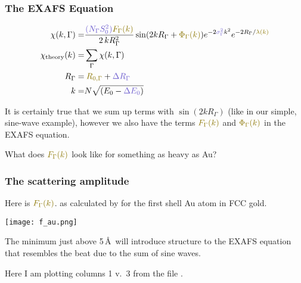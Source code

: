 \documentclass[10pt, xcolor=x11names, compress]{beamer}
\begin{document}
\begin{frame}
  \frametitle{The EXAFS Equation}
  {\small
    \begin{align}
      \chi(k,\Gamma) =&
      { \frac{{\color{SlateBlue3}(N_\Gamma S_0^2)}{\color{Gold4}F_\Gamma(k)}}
        {2\,kR_\Gamma^2} }
      \sin(2kR_\Gamma + {\color{Gold4}\Phi_\Gamma(k)})
      e^{-2{\color{SlateBlue3}\sigma_\Gamma^2}k^2}
      e^{-2R_\Gamma/{\color{Gold4}\lambda(k)}} \\
      \chi_{\mathrm{theory}}(k) =& \sum\limits_{\Gamma}\chi(k,\Gamma) \notag\\
      R_\Gamma =& \> {\color{Gold4}R_{0,\Gamma}} +
      {\color{SlateBlue3}\Delta R_\Gamma} \\
      k =& N\sqrt{(E_0 - {\color{SlateBlue3}\Delta E_0})}
    \end{align}}

  \medskip

  It is certainly true that we sum up terms with $\sin(2kR_\Gamma)$
  (like in our simple, sine-wave example), however we also have the
  terms ${\color{Gold4}F_\Gamma(k)}$ and
  ${\color{Gold4}\Phi_\Gamma(k)}$ in the EXAFS equation.

  \medskip

  \begin{block}{}
    \centering What does ${\color{Gold4}F_\Gamma(k)}$ look like for
    something as heavy as Au?
  \end{block}
\end{frame}

\begin{frame}
  \frametitle{The scattering amplitude}
  Here is ${\color{Gold4}F_\Gamma(k)}$. as calculated by {\feff} for
  the first shell Au atom in FCC gold.
  \begin{center}
    \texttt{[image: f\_au.png]}
  \end{center}
  The minimum just above 5\,\AA\ will introduce structure to the EXAFS
  equation that resembles the beat due to the sum of sine waves.
  \begin{bottomnote}[0.7][19.5]%
    Here I am plotting columns 1 v.\ 3 from the file .
  \end{bottomnote}
\end{frame}
\end{document}
